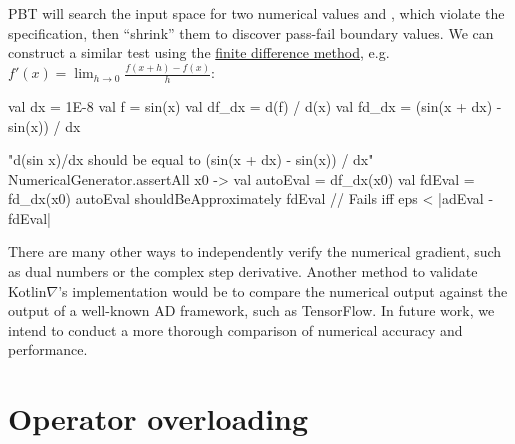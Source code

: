 %
PBT will search the input space for two numerical values  and , which violate the specification, then ``shrink'' them to discover pass-fail boundary values. We can construct a similar test using the \hyperref[sec:fdm]{finite difference method}, e.g. $f'(x)=\lim _{h\to 0}{\frac {f(x+h)-f(x)}{h}}$:
%
\begin{kotlinlisting}
val dx = 1E-8
val f = sin(x)
val df_dx = d(f) / d(x)
val fd_dx = (sin(x + dx) - sin(x)) / dx

"d(sin x)/dx should be equal to (sin(x + dx) - sin(x)) / dx" {
    NumericalGenerator.assertAll { x0 ->
    val autoEval = df_dx(x0)
        val fdEval = fd_dx(x0)
        autoEval shouldBeApproximately fdEval // Fails iff eps < |adEval - fdEval|
    }
}
\end{kotlinlisting}
%
There are many other ways to independently verify the numerical gradient, such as dual numbers or the complex step derivative. Another method to validate Kotlin$\nabla$'s implementation would be to compare the numerical output against the output of a well-known AD framework, such as TensorFlow. In future work, we intend to conduct a more thorough comparison of numerical accuracy and performance.

\section{Operator overloading}\label{sec:operator-overloading}

